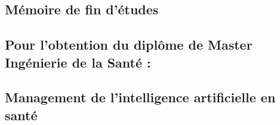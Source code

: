 \documentclass[
]{article}
\begin{document}
\hypertarget{section-12}{%
\subsection{}\label{section-12}}

\hypertarget{section-13}{%
\subsection{}\label{section-13}}

\hypertarget{section-14}{%
\subsection{}\label{section-14}}

\hypertarget{section-15}{%
\subsection{}\label{section-15}}

\hypertarget{section-16}{%
\subsection{}\label{section-16}}

\hypertarget{section-17}{%
\subsection{}\label{section-17}}

\hypertarget{section-18}{%
\subsection{}\label{section-18}}

\hypertarget{muxe9moire-de-fin-duxe9tudes}{%
\subsection{Mémoire de fin d'études}\label{muxe9moire-de-fin-duxe9tudes}}

\hypertarget{pour-lobtention-du-dipluxf4me-de-master-inguxe9nierie-de-la-santuxe9}{%
\subsection{Pour l'obtention du diplôme de Master Ingénierie de la Santé :}\label{pour-lobtention-du-dipluxf4me-de-master-inguxe9nierie-de-la-santuxe9}}

\hypertarget{management-de-lintelligence-artificielle-en-santuxe9}{%
\subsection{Management de l'intelligence artificielle en santé}\label{management-de-lintelligence-artificielle-en-santuxe9}}
\end{document}
